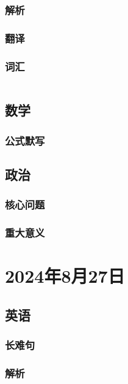\documentclass[UTF8]{ctexart}
\begin{document}
\subsubsection{解析}
\subsubsection{翻译}
\subsubsection{词汇}
\begin{table}[h]
      \centering
      \begin{tabular}{p{}p{}}
      \end{tabular}
\end{table}
\subsection{数学}
\subsubsection{公式默写}
\begin{multicols}{2}
\end{multicols}
\subsection{政治}
\subsubsection{}
\subsubsection{核心问题}
\subsubsection{重大意义}
\section{2024年8月27日}
\subsection{英语}
\subsubsection{长难句}
\subsubsection{解析}
\end{document}
